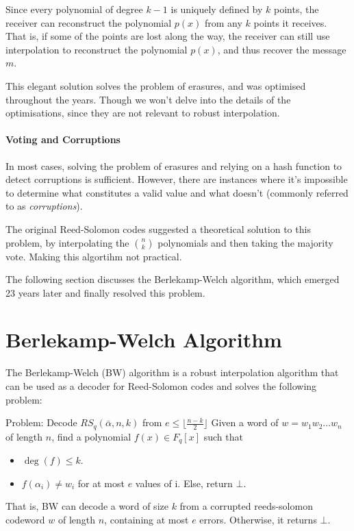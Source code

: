 Since every polynomial of degree $k-1$ is uniquely defined by $k$ points,
the receiver can reconstruct the polynomial $p(x)$ from any $k$ points it receives.
That is, if some of the points are lost along the way, the receiver can still
use interpolation to reconstruct the polynomial $p(x)$, and thus recover the message $m$.

This elegant solution solves the problem of erasures, and was optimised throughout the 
years. Though we won't delve into the details of the optimisations, since they 
are not relevant to robust interpolation.


\paragraph{Voting and Corruptions}
    In most cases, solving the problem of erasures and relying on a hash 
    function to detect corruptions is sufficient. However, there are instances 
    where it's impossible to determine what constitutes a valid value 
    and what doesn't (commonly referred to as \emph{corruptions}).

    The original Reed-Solomon codes suggested a theoretical solution
    to this problem, by interpolating the $\binom{n}{k}$ polynomials
    and then taking the majority vote.
    Making this algortihm not practical.

    The following section discusses the Berlekamp-Welch algorithm,
    which emerged 23 years later and finally resolved this problem.

\section{Berlekamp-Welch Algorithm}
The Berlekamp-Welch (BW) algorithm is a robust interpolation algorithm that
can be used as a decoder for Reed-Solomon codes and solves the following problem:

\begin{notice}{Problem: Decode $RS_q(\bar{\alpha},n,k)$ from $e\le \lfloor\frac{n-k}{2}\rfloor$}
Given a word of $w=w_1w_2\dots w_n$ of length $n$, 
find a polynomial $f(x)\in F_q[x]$ such that
\begin{itemize}
    \item $\deg(f)\le k$.
    \item $f(\alpha_i)\ne w_i$ for at most $e$ values of i. Else, return $\bot$.
\end{itemize}

\end{notice}
That is, BW can decode a word of size $k$ from a corrupted reeds-solomon 
codeword $w$ of length $n$, containing at most $e$ errors. Otherwise, it returns $\bot$.

